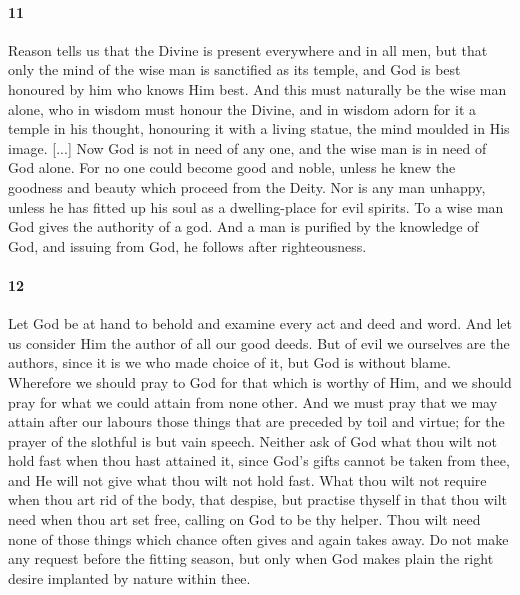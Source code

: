 \documentclass[12pt]{article}
\begin{document}
\paragraph{11} Reason tells us that the Divine is present everywhere and in all
men, but that only the mind of the wise man is sanctified as its temple, and
God is best honoured by him who knows Him best. And this must naturally be the
wise man alone, who in wisdom must honour the Divine, and in wisdom adorn for
it a temple in his thought, honouring it with a living statue, the mind moulded
in His image. [...] Now God is not in need of any one, and the wise man is in
need of God alone. For no one could become good and noble, unless he knew the
goodness and beauty which proceed from the Deity. Nor is any man unhappy,
unless he has fitted up his soul as a dwelling-place for evil spirits. To a
wise man God gives the authority of a god. And a man is purified by the
knowledge of God, and issuing from God, he follows after righteousness.

\paragraph{12} Let God be at hand to behold and examine every act and deed and
word. And let us consider Him the author of all our good deeds. But of evil we
ourselves are the authors, since it is we who made choice of it, but God is
without blame. Wherefore we should pray to God for that which is worthy of Him,
and we should pray for what we could attain from none other. And we must pray
that we may attain after our labours those things that are preceded by toil and
virtue; for the prayer of the slothful is but vain speech. Neither ask of God
what thou wilt not hold fast when thou hast attained it, since God's gifts
cannot be taken from thee, and He will not give what thou wilt not hold fast.
What thou wilt not require when thou art rid of the body, that despise, but
practise thyself in that thou wilt need when thou art set free, calling on God
to be thy helper. Thou wilt need none of those things which chance often gives
and again takes away. Do not make any request before the fitting season, but
only when God makes plain the right desire implanted by nature within thee.
\end{document}
